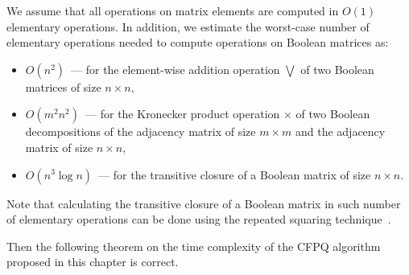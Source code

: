 We assume that all operations on matrix elements are computed in $O(1)$ elementary operations. In addition, we estimate the worst-case number of elementary operations needed to compute operations on Boolean matrices as:
\begin{itemize}
    \item $O(n^2)$~--- for the element-wise addition operation $\bigvee$ of two Boolean matrices of size $n \times n$,
    \item $O(m^2n^2)$~--- for the Kronecker product operation $\times$ of two Boolean decompositions of the adjacency matrix of size $m \times m$ and the adjacency matrix of size $n \times n$,
    \item $O(n^3\log n)$~--- for the transitive closure of a Boolean matrix of size $n \times n$.
\end{itemize}

Note that calculating the transitive closure of a Boolean matrix in such number of elementary operations can be done using the repeated squaring technique~\cite{baras2010path}.

Then the following theorem on the time complexity of the CFPQ algorithm proposed in this chapter is correct.

